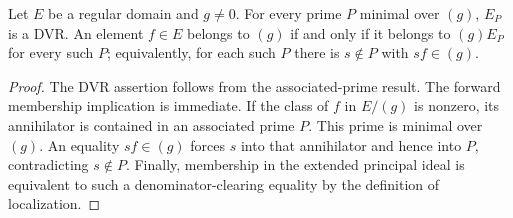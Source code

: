 \begin{theorem}\label{thm:regular-principal-dvr-detection}
\leanok
{}
Let $E$ be a regular domain and $g\ne0$. For every prime $P$ minimal
over $(g)$, $E_P$ is a DVR. An element $f\in E$ belongs to $(g)$ if
and only if it belongs to $(g)E_P$ for every such $P$; equivalently,
for each such $P$ there is $s\notin P$ with $sf\in(g)$.
\end{theorem}
\begin{proof}
The DVR assertion follows from the associated-prime result. The forward
membership implication is immediate. If the class of $f$ in $E/(g)$
is nonzero, its annihilator is contained in an associated prime $P$.
This prime is minimal over $(g)$. An equality $sf\in(g)$ forces
$s$ into that annihilator and hence into $P$, contradicting $s\notin P$.
Finally, membership in the extended principal ideal is equivalent to
such a denominator-clearing equality by the definition of localization.
\end{proof}
